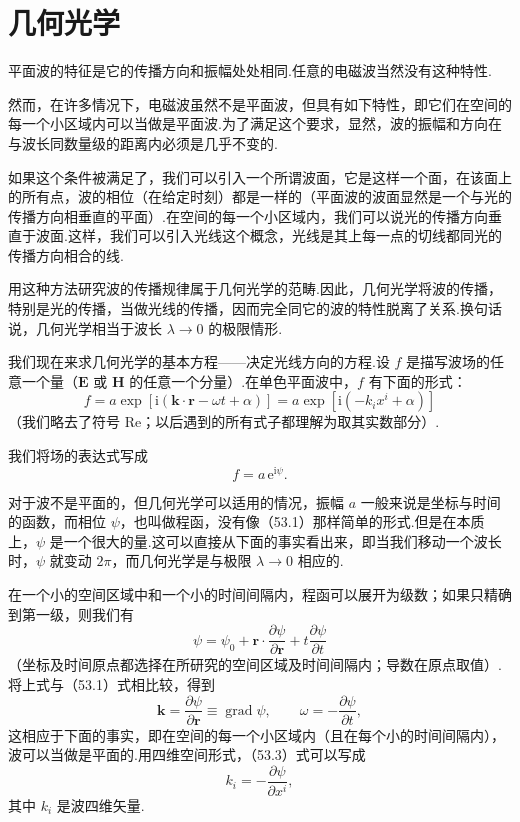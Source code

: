 \section{几何光学}

平面波的特征是它的传播方向和振幅处处相同.任意的电磁波当然没有这种特性.

然而，在许多情况下，电磁波虽然不是平面波，但具有如下特性，即它们在空间的每一个小区域内可以当做是平面波.为了满足这个要求，显然，波的振幅和方向在与波长同数量级的距离内必须是几乎不变的.

如果这个条件被满足了，我们可以引入一个所谓波面，它是这样一个面，在该面上的所有点，波的相位（在给定时刻）都是一样的（平面波的波面显然是一个与光的传播方向相垂直的平面）.在空间的每一个小区域内，我们可以说光的传播方向垂直于波面.这样，我们可以引入光线这个概念，光线是其上每一点的切线都同光的传播方向相合的线.

用这种方法研究波的传播规律属于几何光学的范畴.因此，几何光学将波的传播，特别是光的传播，当做光线的传播，因而完全同它的波的特性脱离了关系.换句话说，几何光学相当于波长 $\lambda\to 0$ 的极限情形.

我们现在来求几何光学的基本方程——决定光线方向的方程.设 $f$ 是描写波场的任意一个量（$\boldsymbol{E}$ 或 $\boldsymbol{H}$ 的任意一个分量）.在单色平面波中，$f$ 有下面的形式：
\begin{equation}
  f=a\exp[\mathrm{i}(\boldsymbol{k}\cdot\boldsymbol{r}-\omega t+\alpha)]
  =a\exp[\mathrm{i}(-k_ix^i+\alpha)]
\end{equation}
（我们略去了符号 $\mathrm{Re}$；以后遇到的所有式子都理解为取其实数部分）.

我们将场的表达式写成
\begin{equation}
  f=a\,\mathrm{e}^{\mathrm{i}\psi}.
\end{equation}

对于波不是平面的，但几何光学可以适用的情况，振幅 $a$ 一般来说是坐标与时间的函数，而相位 $\psi$，也叫做程函，没有像（53.1）那样简单的形式.但是在本质上，$\psi$ 是一个很大的量.这可以直接从下面的事实看出来，即当我们移动一个波长时，$\psi$ 就变动 $2\pi$，而几何光学是与极限 $\lambda\to 0$ 相应的.

在一个小的空间区域中和一个小的时间间隔内，程函可以展开为级数；如果只精确到第一级，则我们有
\begin{equation*}
  \psi=\psi_0+\boldsymbol{r}\cdot\frac{\partial\psi}{\partial\boldsymbol{r}}
  +t\frac{\partial\psi}{\partial t}
\end{equation*}
（坐标及时间原点都选择在所研究的空间区域及时间间隔内；导数在原点取值）.将上式与（53.1）式相比较，得到
\begin{equation}
  \boldsymbol{k}=\frac{\partial\psi}{\partial\boldsymbol{r}}
  \equiv\operatorname{grad}\psi,\qquad
  \omega=-\frac{\partial\psi}{\partial t},
\end{equation}
这相应于下面的事实，即在空间的每一个小区域内（且在每个小的时间间隔内），波可以当做是平面的.用四维空间形式，（53.3）式可以写成
\begin{equation}
  k_i=-\frac{\partial\psi}{\partial x^i},
\end{equation}
其中 $k_i$ 是波四维矢量.

